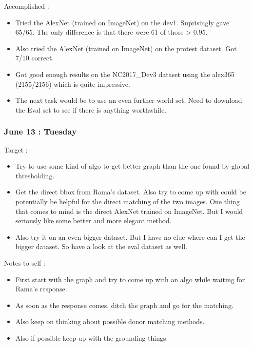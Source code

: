 \documentclass{article}
\begin{document}
Accomplished :
\begin{itemize}
\item Tried the AlexNet (trained on ImageNet) on the dev1. Suprisingly gave 65/65. The only difference is that there were 61 of those > 0.95.
\item Also tried the AlexNet (trained on ImageNet) on the protest dataset. Got 7/10 correct.
\item Got good enough results on the NC2017\_Dev3 dataset using the alex365 (2155/2156) which is quite impressive.
\item The next task would be to use an even further world set. Need to download the Eval set to see if there is anything worthwhile.
\end{itemize}

\subsubsection{June 13 : Tuesday}
Target :
\begin{itemize}
\item Try to use some kind of algo to get better graph than the one found by global thresholding.
\item Get the direct bbox from Rama's dataset. Also try to come up with could be potentially be helpful for the direct matching of the two images. One thing that comes to mind is the direct AlexNet trained on ImageNet. But I would seriously like some better and more elegant method.
\item Also try it on an even bigger dataset. But I have no clue where can I get the bigger dataset. So have a look at the eval dataset as well.
\end{itemize}

Notes to self :
\begin{itemize}
\item First start with the graph and try to come up with an algo while waiting for Rama's response.
\item As soon as the response comes, ditch the graph and go for the matching.
\item Also keep on thinking about possible donor matching methods.
\item Also if possible keep up with the grounding things.
\end{itemize}
\end{document}
